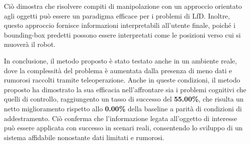 Ciò dimostra che risolvere compiti di manipolazione con un approccio orientato agli oggetti può essere un paradigma efficace per i problemi di LfD. Inoltre, questo approccio fornisce informazioni interpretabili all'utente finale, poiché i bounding-box predetti possono essere interpretati come le posizioni verso cui si muoverà il robot.

In conclusione, il metodo proposto è stato testato anche in un ambiente reale, dove la complessità del problema è aumentata dalla presenza di meno dati e rumorosi raccolti tramite teleoperazione. Anche in queste condizioni, il metodo proposto ha dimostrato la sua efficacia nell'affrontare sia i problemi cognitivi che quelli di controllo, raggiungento un tasso di successo del \textbf{55.00\%}, che risulta un netto miglioramento rispetto allo \textbf{0.00\%} della baseline a parità di condizioni di addestramento. Ciò conferma che l'informazione legata all'oggetto di interesse può essere applicata con successo in scenari reali, consentendo lo sviluppo di un sistema affidabile nonostante dati limitati e rumorosi.
